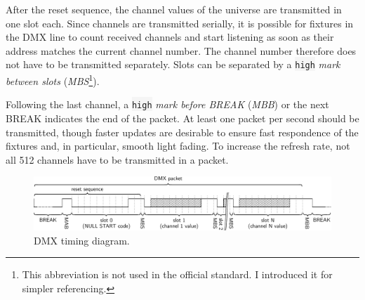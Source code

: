 After the reset sequence, the channel values of the universe are
transmitted in one slot each. Since channels are transmitted serially,
it is possible for fixtures in the DMX line to count received channels
and start listening as soon as their address matches the current channel
number. The channel number therefore does not have to be transmitted
separately. Slots can be separated by a \colorbox{WhiteSmoke}{\lstinline!high!} \emph{mark
between slots} (\emph{MBS}\footnote{This abbreviation is not used in the
  official standard. I introduced it for simpler referencing.}).

Following the last channel, a \colorbox{WhiteSmoke}{\lstinline!high!} \emph{mark before BREAK}
(\emph{MBB}) or the next BREAK indicates the end of the packet. At least
one packet per second should be transmitted, though faster updates are
desirable to ensure fast respondence of the fixtures and, in particular,
smooth light fading. To increase the refresh rate, not all 512 channels
have to be transmitted in a packet.

\begin{figure}
\centering
\includegraphics[width=1.00000\textwidth]{Bilder/dmx-timing.pdf}
\caption[DMX timing diagram]{DMX timing diagram.}\label{fig:dmx-timing}
\end{figure}


